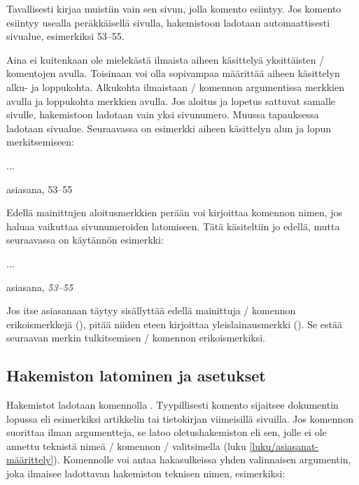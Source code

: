 Tavallisesti  kirjaa muistiin vain sen sivun, jolla
komento esiintyy. Jos komento esiintyy usealla peräkkäisellä sivulla,
hakemistoon ladotaan automaattisesti sivualue, esimerkiksi 53--55.

Aina ei kuitenkaan ole mielekästä ilmaista aiheen käsittelyä
yksittäisten \-/ komentojen avulla. Toisinaan voi olla
sopivampaa määrittää aiheen käsittelyn alku- ja loppukohta. Alkukohta
ilmaistaan \-/ komennon argumentissa merkkien \koodi{|(}
avulla ja loppukohta merkkien \koodi{|)} avulla. Jos aloitus ja lopetus
sattuvat samalle sivulle, hakemistoon ladotaan vain yksi sivunumero.
Muussa tapauksessa ladotaan sivualue. Seuraavassa on esimerkki aiheen
käsittelyn alun ja lopun merkitsemiseen:

\begin{koodilohkosis}
...
\end{koodilohkosis}

\begin{tulossis}
  asiasana, 53--55
\end{tulossis}

\noindent
Edellä mainittujen aloitusmerkkien \koodi{|(} perään voi kirjoittaa
komennon nimen, jos haluaa vaikuttaa sivunumeroiden latomiseen. Tätä
käsiteltiin jo edellä, mutta seuraavassa on käytännön esimerkki:

\begin{koodilohkosis}
...
\end{koodilohkosis}

\begin{tulossis}
  asiasana, \textit{53--55}
\end{tulossis}

\noindent
Jos itse asiasanaan täytyy sisällyttää edellä mainittuja
\-/ komennon erikoismerkkejä (), pitää niiden
eteen kirjoittaa yleislainausmerkki (\koodi{\textquotedbl}). Se estää
seuraavan merkin tulkitsemisen \-/ komennon
erikoismerkiksi.

\subsection{Hakemiston latominen ja asetukset}
\label{luku/asiasanat-asetukset}

Hakemistot ladotaan komennolla . Tyypillisesti
komento sijaitsee dokumentin lopussa eli esimerkiksi artikkelin tai
tietokirjan viimeisillä sivuilla. Jos komennon suorittaa ilman
argumentteja, se latoo oletushakemiston eli sen, jolle ei ole annettu
teknistä nimeä \-/ komennon \-/
valitsimella (luku \ref{luku/asiasanat-määrittely}). Komennolle voi
antaa hakasulkeissa yhden valinnaisen argumentin, joka ilmaisee
ladottavan hakemiston teknisen nimen, esimerkiksi:

